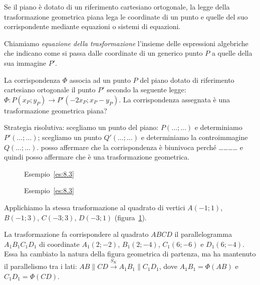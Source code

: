 Se il piano è dotato di un riferimento cartesiano ortogonale, la legge della trasformazione geometrica piana lega le coordinate di un punto e quelle del suo corrispondente mediante equazioni o sistemi di equazioni.
 
\begin{definizione}
Chiamiamo \emph{equazione della trasformazione} l'insieme delle espressioni algebriche che indicano come si passa dalle coordinate di un generico punto $P$ a quelle della sua immagine $P'$.
\end{definizione}

\begin{exrig}
\begin{esempio}\label{es:8.3}
La corrispondenza $\Phi$ associa ad un punto $P$ del piano dotato di riferimento cartesiano ortogonale il punto $P'$ secondo la seguente legge:
$\Phi : P(x_P;y_P) \rightarrow P'(-2x_P;x_P-y_P)$. La corrispondenza assegnata è una trasformazione geometrica piana?\vspace{7pt}

Strategia risolutiva: 
scegliamo un punto del piano: $P(\ldots{};\ldots{})$ e determiniamo $P'(\ldots{};\ldots{})$;
scegliamo un punto $Q'(\ldots{};\ldots{})$ e determiniamo la controimmagine $Q(\ldots{};\ldots{})$.
posso affermare che la corrispondenza è biunivoca perché \ldots\ldots\ldots\ldots{} e quindi posso affermare che è una trasformazione geometrica.

\begin{figure}[!htb]
\begin{center}
 \noindent\begin{minipage}{0.49\textwidth}
    \centering
	\caption{Esempio~\ref{es:8.3}}\label{fig:es8.3a}
 \end{minipage}
 \noindent\begin{minipage}{0.49\textwidth}
    \centering
    \caption{Esempio~\ref{es:8.3}}\label{fig:es8.3b}
 \end{minipage}
\end{center}
\end{figure}


Applichiamo la stessa trasformazione al quadrato di vertici $A(-1;1)$, $B(-1;3)$, $C(-3;3)$, $D(-3;1)$ (figura~\ref{fig:es8.3b}).

La trasformazione fa corrispondere al quadrato $ABCD$ il parallelogramma $A_1B_1C_1D_1$ di coordinate $A_1(2;-2)$, $B_1(2;-4)$, $C_1(6;-6)$ e $D_1(6;-4)$. Essa ha cambiato la natura della figura geometrica di partenza, ma ha mantenuto il parallelismo tra i lati: $AB\parallel CD \overset{S_K}{\rightarrow} A_1B_1\parallel C_1D_1$, dove $A_1B_1=\Phi(AB)$ e $C_1D_1=\Phi(CD)$.
\end{esempio}
\end{exrig}

